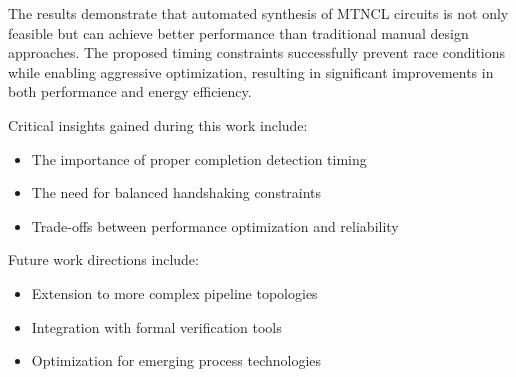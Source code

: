 \documentclass[conference]{IEEEtran}
\begin{document}
The results demonstrate that automated synthesis of MTNCL circuits is not only feasible but can achieve better performance than traditional manual design approaches. The proposed timing constraints successfully prevent race conditions while enabling aggressive optimization, resulting in significant improvements in both performance and energy efficiency.

Critical insights gained during this work include:
\begin{itemize}
\item The importance of proper completion detection timing
\item The need for balanced handshaking constraints
\item Trade-offs between performance optimization and reliability
\end{itemize}

Future work directions include:
\begin{itemize}
\item Extension to more complex pipeline topologies
\item Integration with formal verification tools
\item Optimization for emerging process technologies
\end{itemize}
\end{document}
